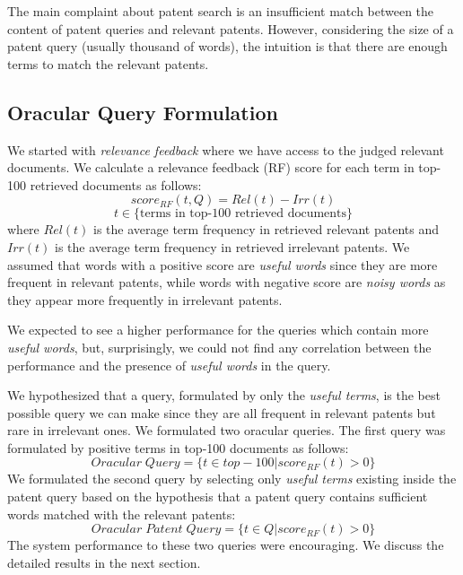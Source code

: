 The main complaint about patent search is an insufficient match between the content of patent queries and relevant
patents\cite{lupu2013patent}\cite{magdy2012toward}. However, considering the size of a patent query (usually thousand of words), the intuition is that there are enough terms to match the relevant patents. 
\subsection{Oracular Query Formulation}
We started with {\em relevance feedback} where we have access to the judged relevant documents. We calculate a relevance feedback (RF) score for each term in top-100 retrieved documents as follows:
\begin{equation}
score_{RF}(t,Q)=Rel(t)-Irr(t) 
 \label{eq:score}
\end{equation}\vspace*{-5ex}
\begin{displaymath}t\in \lbrace \mbox{terms in top-100 retrieved documents}\rbrace\end{displaymath}
where $ Rel(t) $ is the average term frequency in retrieved relevant patents and $ Irr(t) $ is the average term frequency in retrieved irrelevant patents. We assumed that words with a positive score are {\em useful words} since they are more frequent in relevant patents, while words with negative score are {\em noisy words} as they appear more frequently in irrelevant patents. 

We expected to see a higher performance for the queries which contain more {\em useful words}, but, surprisingly, we could not find any correlation between the performance and the presence of {\em useful words} in the query. 

We hypothesized that a query, formulated by only the {\em useful terms}, is the best possible query we can make since they are all frequent in relevant patents but rare in irrelevant ones. We formulated two oracular queries. The first query was formulated by positive terms in top-100 documents as follows: 
\begin{equation}
Oracular \; Query = \{t \in top-100|score_{RF}(t)>0\}   
 \label{eq:score}
\end{equation}
We formulated the second query by selecting only {\em useful terms} existing inside the patent query based on the hypothesis that a patent query contains sufficient words matched with the relevant patents:
\begin{equation}
 Oracular \; Patent \; Query = \{t\in Q|score_{RF}(t)>0\}   
 \label{eq:score}
\end{equation}
The system performance to these two queries were encouraging. We discuss the detailed results in the next section.

